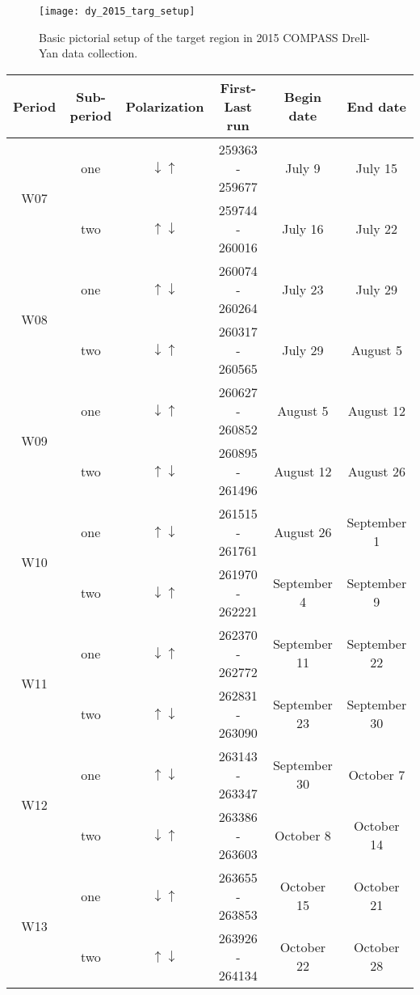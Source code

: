 \begin{figure}[h!t]
  \centering \texttt{[image: dy\_2015\_targ\_setup]}
  \caption{Basic pictorial setup of the target region in 2015 COMPASS Drell-Yan
    data collection.}
  \label{fig::dy_2015_targ_setup}
\end{figure}


\begin{table}[h!t]
  \centering
  \begin{tabular}{ |c|c|c|c|c|c| }
    \hline Period& Sub-period& Polarization& First-Last run& Begin date& End
    date \\ \hline
    
    \multirow{2}{2em}{W07}& one& $\downarrow \uparrow$& 259363 - 259677& July
    9& July 15 \\ & two& $\uparrow \downarrow$& 259744 - 260016& July 16& July
    22 \\ \hline

    \multirow{2}{2em}{W08}& one& $\uparrow \downarrow$& 260074 - 260264& July
    23& July 29 \\ & two& $\downarrow \uparrow$& 260317 - 260565& July 29&
    August 5 \\ \hline

    \multirow{2}{2em}{W09}& one& $\downarrow \uparrow$& 260627 - 260852&
    August 5& August 12 \\ & two& $\uparrow \downarrow$& 260895 - 261496&
    August 12& August 26 \\ \hline

    \multirow{2}{2em}{W10}& one& $\uparrow \downarrow$& 261515 - 261761&
    August 26& September 1 \\ & two& $\downarrow \uparrow$& 261970 - 262221&
    September 4& September 9 \\ \hline

    \multirow{2}{2em}{W11}& one& $\downarrow \uparrow$& 262370 - 262772&
    September 11& September 22 \\ & two& $\uparrow \downarrow$& 262831 -
    263090& September 23& September 30 \\ \hline

    \multirow{2}{2em}{W12}& one& $\uparrow \downarrow$& 263143 - 263347&
    September 30& October 7 \\ & two& $\downarrow \uparrow$& 263386 - 263603&
    October 8& October 14 \\ \hline

    \multirow{2}{2em}{W13}& one& $\downarrow \uparrow$& 263655 - 263853&
    October 15& October 21 \\ & two& $\uparrow \downarrow$& 263926 - 264134&
    October 22& October 28 \\ \hline


\end{tabular}
\end{table}
